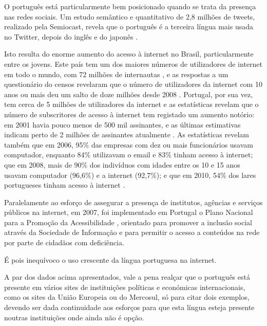 \begin{multicols}{2}
O português está particularmente bem posicionado quando se trata da presença nas redes sociais. Um estudo semântico e quantitativo de 2,8 milhões de tweets, realizado pela Semiocast, revela que o português é a terceira língua mais usada no Twitter, depois do inglês e do japonês \cite{stat7}.


Isto resulta do enorme aumento do acesso à internet no Brasil, particularmente entre os jovens. 
Este país tem um dos maiores números de utilizadores de internet em todo o mundo,  com 72 milhões de internautas \cite{statop20}, 
e as respostas a um questionário do censos revelaram que o número de utilizadores da internet com 10 anos ou mais deu um salto de doze milhões desde 2008 \cite{mybroadband}. 
Portugal, por sua vez, tem cerca de 5 milhões de utilizadores da internet  \cite{stat4}  \cite{stat15} e as estatísticas revelam que o número de subscritores de acesso
à internet tem registado um aumento notório: em 2001 havia pouco menos de 500 mil assinantes, 
e as últimas estimativas indicam perto de 2 milhões de assinantes atualmente \cite{pordata}. 
As estatísticas revelam também que
em 2006, 95\% das empresas com dez ou mais funcionários usavam computador, enquanto 84\% utilizavam o email e 83\% tinham acesso à internet;
que em 2008, mais de 90\% dos indivíduos com idades entre os 10 e 15 anos usavam computador (96,6\%) e a internet (92,7\%);
e que em 2010, 54\% dos lares portugueses tinham acesso à internet \cite{pordata}.

Paralelamente ao esforço de assegurar a presença de institutos, agências e serviços públicos na internet, 
em 2007, foi implementado em Portugal o Plano Nacional para a Promoção da Acessibilidade \cite{umic},
orientado para promover a inclusão social através da Sociedade de Informação e para permitir o acesso a conteúdos 
na rede por parte de cidadãos com deficiência.

É pois inequívoco o uso crescente da língua portuguesa na internet. 

A par dos dados acima apresentados, vale a pena realçar que o português está presente em vários sites de instituições políticas e económicas internacionais, 
como os sites da União Europeia ou do Mercosul, só para citar dois exemplos, 
devendo ser dada continuidade aos esforços para que esta língua esteja presente noutras instituições onde ainda não é opção.

\end{multicols}

